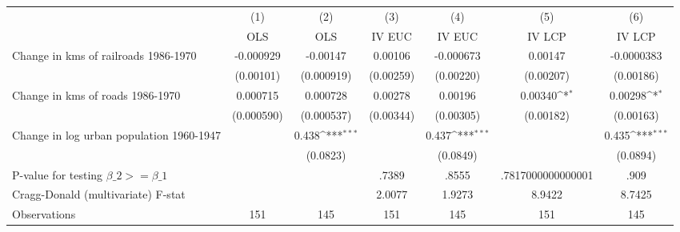 {
\def\sym#1{\ifmmode^{#1}\else\(^{#1}\)\fi}
\begin{tabular}{l*{6}{c}}
\hline\hline
                &\multicolumn{1}{c}{(1)}&\multicolumn{1}{c}{(2)}&\multicolumn{1}{c}{(3)}&\multicolumn{1}{c}{(4)}&\multicolumn{1}{c}{(5)}&\multicolumn{1}{c}{(6)}\\
                &\multicolumn{1}{c}{OLS}&\multicolumn{1}{c}{OLS}&\multicolumn{1}{c}{IV EUC}&\multicolumn{1}{c}{IV EUC}&\multicolumn{1}{c}{IV LCP}&\multicolumn{1}{c}{IV LCP}\\
\hline
Change in kms of railroads 1986-1970&-0.000929         & -0.00147         &  0.00106         &-0.000673         &  0.00147         &-0.0000383         \\
                &(0.00101)         &(0.000919)         &(0.00259)         &(0.00220)         &(0.00207)         &(0.00186)         \\
[1em]
Change in kms of roads 1986-1970& 0.000715         & 0.000728         &  0.00278         &  0.00196         &  0.00340\sym{*}  &  0.00298\sym{*}  \\
                &(0.000590)         &(0.000537)         &(0.00344)         &(0.00305)         &(0.00182)         &(0.00163)         \\
[1em]
Change in log urban population 1960-1947&                  &    0.438\sym{***}&                  &    0.437\sym{***}&                  &    0.435\sym{***}\\
                &                  & (0.0823)         &                  & (0.0849)         &                  & (0.0894)         \\
\hline
P-value for testing $\beta\_{2} >= \beta\_{1}$&                  &                  &    .7389         &    .8555         &.7817000000000001         &     .909         \\
Cragg-Donald (multivariate) F-stat&                  &                  &   2.0077         &   1.9273         &   8.9422         &   8.7425         \\
Observations    &      151         &      145         &      151         &      145         &      151         &      145         \\
\hline\hline
\end{tabular}
}
